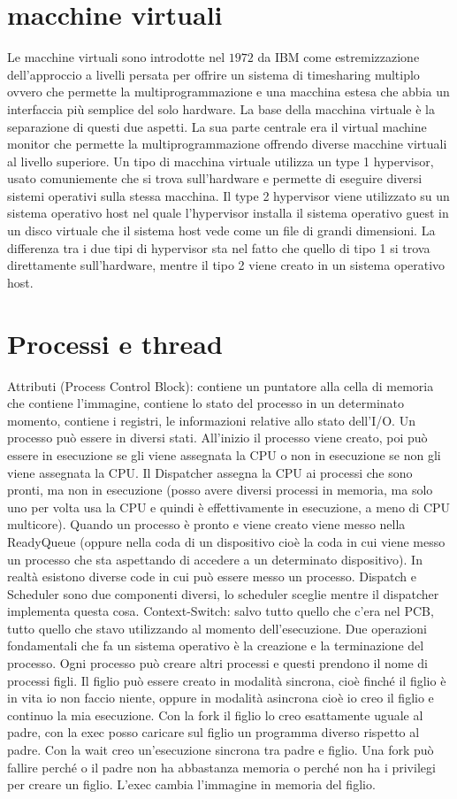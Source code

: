 \section{macchine virtuali}
Le macchine virtuali sono introdotte nel $1972$ da IBM come estremizzazione dell'approccio a livelli persata per offrire un sistema di timesharing multiplo ovvero che permette la
multiprogrammazione e una macchina estesa che abbia un interfaccia pi\`u semplice del solo hardware. La base della macchina virtuale \`e la separazione di questi due aspetti. La sua parte
centrale era il virtual machine monitor che permette la multiprogrammazione offrendo diverse macchine virtuali al livello superiore. Un tipo di macchina virtuale utilizza un type 1 
hypervisor, usato comuniemente che si trova sull'hardware e permette di eseguire diversi sistemi operativi sulla stessa macchina. Il type 2 hypervisor viene utilizzato su un sistema 
operativo host nel quale l'hypervisor installa il sistema operativo guest in un disco virtuale che il sistema host vede come un file di grandi dimensioni. La differenza tra i due tipi
di hypervisor sta nel fatto che quello di tipo 1 si trova direttamente sull'hardware, mentre il tipo 2 viene creato in un sistema operativo host.
\section{Processi e thread}
Attributi (Process Control Block): contiene un puntatore alla cella di memoria che contiene l’immagine, contiene lo stato del processo in un determinato momento, contiene i registri, le informazioni relative allo stato dell’I/O. 
Un processo può essere in diversi stati. 
All’inizio il processo viene creato, poi può essere in esecuzione se gli viene assegnata la CPU o non in esecuzione se non gli viene assegnata la CPU. Il Dispatcher assegna la CPU ai processi che sono pronti, ma non in esecuzione (posso 
avere diversi processi in memoria, ma solo uno per volta usa la CPU e quindi è effettivamente in esecuzione, a meno di CPU multicore). Quando un processo è pronto e viene creato viene messo nella ReadyQueue (oppure nella coda di un 
dispositivo cioè la coda in cui viene messo un processo che sta aspettando di accedere a un determinato dispositivo). In realtà esistono diverse code in cui può essere messo un processo. Dispatch e Scheduler sono due componenti diversi, 
lo scheduler sceglie mentre il dispatcher implementa questa cosa. Context-Switch: salvo tutto quello che c’era nel PCB, tutto quello che stavo utilizzando al momento dell’esecuzione. Due operazioni fondamentali che fa un sistema operativo
è la creazione e la terminazione del processo. Ogni processo può creare altri processi e questi prendono il nome di processi figli. Il figlio può essere creato in modalità sincrona, cioè finché il figlio è in vita io non faccio niente, 
oppure in modalità asincrona cioè io creo il figlio e continuo la mia esecuzione. Con la fork il figlio lo creo esattamente uguale al padre, con la exec posso caricare sul figlio un programma diverso rispetto al padre. Con la wait creo 
un’esecuzione sincrona tra padre e figlio. Una fork può fallire perché o il padre non ha abbastanza memoria o perché non ha i privilegi per creare un figlio. L’exec cambia l’immagine in memoria del figlio. 
